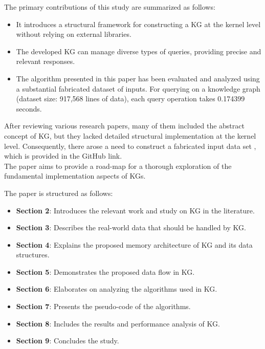 \documentclass[conference]{IEEEtran}
\begin{document}
The primary contributions of this study are summarized as follows:

\begin{itemize}
    \item It introduces a structural framework for constructing a KG at the kernel level without relying on external libraries.
    \item The developed KG can manage diverse types of queries, providing precise and relevant responses.
    \item The algorithm presented in this paper has been evaluated and analyzed using a substantial fabricated dataset of inputs. For querying on a knowledge graph (dataset size: 917,568 lines of data), each query operation takes 0.174399 seconds.
\end{itemize}

After reviewing various research papers, many of them included the abstract concept of KG, but they lacked detailed structural implementation at the kernel level. 
Consequently, there arose a need to construct a fabricated input data set \cite{b11}, which is provided in the GitHub link.\\
The paper aims to provide a road-map for a thorough exploration of the fundamental implementation aspects of KGs.


The paper is structured as follows:

\begin{itemize}
    \item \textbf{Section 2}: Introduces the relevant work and study on KG in the literature.
    \item \textbf{Section 3}: Describes the real-world data that should be handled by KG.
    \item \textbf{Section 4}: Explains the proposed memory architecture of KG and its data structures.
    \item \textbf{Section 5}: Demonstrates the proposed data flow in KG.
    \item \textbf{Section 6}: Elaborates on analyzing the algorithms used in KG.
    \item \textbf{Section 7}: Presents the pseudo-code of the algorithms.
    \item \textbf{Section 8}: Includes the results and performance analysis of KG.
    \item \textbf{Section 9}: Concludes the study.
\end{itemize}
\end{document}
